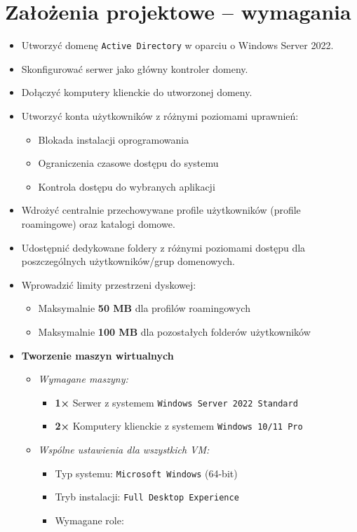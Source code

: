 \newpage

\section{Założenia projektowe – wymagania}
\begin{itemize}
\item Utworzyć domenę \texttt{Active Directory} w oparciu o Windows Server 2022.
\item Skonfigurować serwer jako główny kontroler domeny.
\item Dołączyć komputery klienckie do utworzonej domeny.
\item Utworzyć konta użytkowników z różnymi poziomami uprawnień:
\begin{itemize}
\item Blokada instalacji oprogramowania
\item Ograniczenia czasowe dostępu do systemu
\item Kontrola dostępu do wybranych aplikacji
\end{itemize}
\item Wdrożyć centralnie przechowywane profile użytkowników (profile roamingowe) oraz katalogi domowe.
\item Udostępnić dedykowane foldery z różnymi poziomami dostępu dla poszczególnych użytkowników/grup domenowych.
\item Wprowadzić limity przestrzeni dyskowej:
\begin{itemize}
\item Maksymalnie \textbf{50 MB} dla profilów roamingowych
\item Maksymalnie \textbf{100 MB} dla pozostałych folderów użytkowników
\end{itemize}

\item \textbf{Tworzenie maszyn wirtualnych}
\begin{itemize}
\item \textit{Wymagane maszyny:}
\begin{itemize}
\item \textbf{1×} Serwer z systemem \texttt{Windows Server 2022 Standard}
\item \textbf{2×} Komputery klienckie z systemem \texttt{Windows 10/11 Pro}
\end{itemize}
\item \textit{Wspólne ustawienia dla wszystkich VM:}
\begin{itemize}
\item Typ systemu: \texttt{Microsoft Windows} (64-bit)
\item Tryb instalacji: \texttt{Full Desktop Experience}
\item Wymagane role:


\end{itemize}
\end{itemize}
\end{itemize}
